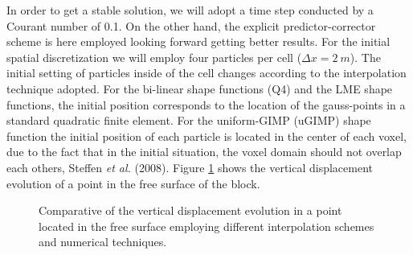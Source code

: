 In order to get a stable solution, we will adopt a time step conducted
by a Courant number of 0.1. On the other hand, the explicit predictor-corrector
scheme is here employed looking forward getting better results. For the
initial spatial discretization we will employ four particles per cell
($\Delta x = 2\ m$). The initial setting of particles inside of the
cell changes according to the interpolation technique adopted. For the
bi-linear shape functions (Q4) and the LME shape functions, the initial
position corresponds to the location of the gauss-points in a standard
quadratic finite element. For the uniform-GIMP (uGIMP) shape function
the initial position of each particle is located in the center of each
voxel, due to the fact that in the initial situation, the voxel domain
should not overlap each others, Steffen {\it et al.}
(2008)\cite{Steffen2008}. Figure \ref{fig:vertical-displacement-block}
shows the vertical displacement evolution of a point in the free
surface of the block.
\begin{figure}\sidecaption
  \centering
  \caption{Comparative of the vertical displacement evolution in a
    point located in the free surface employing different
    interpolation schemes and numerical techniques.} 
  \label{fig:vertical-displacement-block}
\end{figure}

